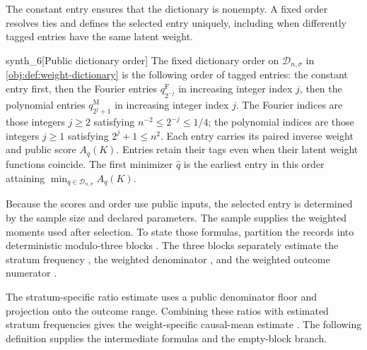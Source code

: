 \documentclass[11pt]{article}
\begin{document}
The constant entry ensures that the dictionary is nonempty. A fixed order resolves ties and defines the selected entry  uniquely, including when differently tagged entries have the same latent weight.

\begin{definitionv}{synth_6}[Public dictionary order]
The fixed dictionary order on \(\mathcal D_{n,\sigma}\) in \cref{obj:def:weight-dictionary} is the following order of tagged entries: the constant entry first, then the Fourier entries \(q_{2^{-j}}^{\mathrm F}\) in increasing integer index \(j\), then the polynomial entries \(q_{2^j+1}^{\mathrm M}\) in increasing integer index \(j\). The Fourier indices are those integers \(j\ge2\) satisfying \(n^{-2}\le2^{-j}\le1/4\); the polynomial indices are those integers \(j\ge1\) satisfying \(2^j+1\le n^2\). Each entry carries its paired inverse weight and public score \(A_q(K)\). Entries retain their tags even when their latent weight functions coincide. The first minimizer \(\widehat q\) is the earliest entry in this order attaining \(\min_{q\in\mathcal D_{n,\sigma}}A_q(K)\).
\end{definitionv}

Because the scores and order use public inputs, the selected entry is determined by the sample size and declared parameters. The sample supplies the weighted moments used after selection. To state those formulas, partition the records into deterministic modulo-three blocks . The three blocks separately estimate the stratum frequency , the weighted denominator , and the weighted outcome numerator .

The stratum-specific ratio estimate  uses a public denominator floor and projection onto the outcome range. Combining these ratios with estimated stratum frequencies gives the weight-specific causal-mean estimate . The following definition supplies the intermediate formulas and the empty-block branch.
\end{document}
